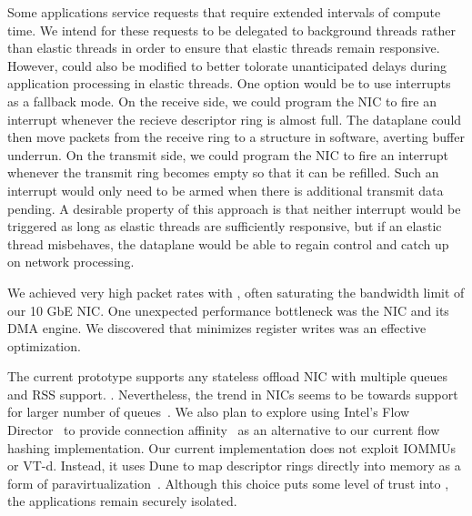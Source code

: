 Some applications
service requests that require extended intervals of
compute time. We intend for these requests to be delegated
to background threads rather than elastic threads in order
to ensure that elastic threads remain responsive.
However, \ix could also be modified to better tolorate
unanticipated delays during application processing in elastic threads.
One option would be to use interrupts as a fallback mode. On the receive side, we
could program the NIC to fire an interrupt whenever the
recieve descriptor ring is almost full. The dataplane could
then move packets from the receive ring to a structure in software, averting
buffer underrun. On the transmit side, we could program
the NIC to fire an interrupt whenever the transmit ring becomes
empty so that it can be refilled. Such an interrupt would only need
to be armed when there is additional transmit data pending. A desirable
property of this approach is that neither interrupt would
be triggered as long as elastic threads are sufficiently responsive,
but if an elastic thread misbehaves, the \ix dataplane would
be able to regain control and catch up on network processing.


 We achieved very high packet
rates with \ix, often saturating the bandwidth limit of our 10 GbE NIC.
One unexpected performance bottleneck was the NIC and its DMA engine.
We discovered that minimizes register writes was an effective optimization.


 


 The current prototype
supports any stateless offload NIC with multiple queues and RSS
support. . Nevertheless, the
trend in NICs seems to be towards support for larger number of
queues~\cite{radhakrishnan2014senic}. We also plan to explore using Intel's Flow
Director~\cite{intel:82599} to provide connection
affinity~\cite{DBLP:conf/eurosys/PesterevSZM12} as an alternative to
our current flow hashing implementation. Our current implementation
does not exploit IOMMUs or VT-d. Instead, it uses Dune to map
descriptor rings directly into \ix memory as a form of
paravirtualization~\cite{DBLP:conf/sosp/BarhamDFHHHN03}.  Although
this choice puts some level of trust into \ix, the applications remain
securely isolated.


